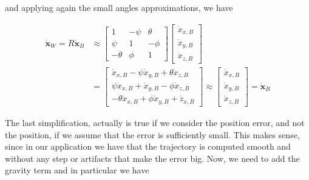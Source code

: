 \noindent and applying again the small angles approximations, we have

\begin{align}
	\dot{\mathbf{x}}_W = R\dot{\mathbf{x}}_B &\approx
	\begin{bmatrix}
		1 & -\psi & \theta \\
		\psi & 1 & -\phi \\
		-\theta & \phi & 1
	\end{bmatrix}
	\begin{bmatrix}
		\dot{x}_{x,B} \\
		\dot{x}_{y,B} \\
		\dot{x}_{z,B} 
	\end{bmatrix} \nonumber \\
	&= 
	\begin{bmatrix}
		\dot{x}_{x,B}-\psi\dot{x}_{y,B}+\theta\dot{x}_{z,B} \\
		\psi\dot{x}_{x,B}+\dot{x}_{y,B}-\phi\dot{x}_{z,B} \\
		-\theta\dot{x}_{x,B}+\phi\dot{x}_{y,B}+\dot{z}_{x,B}
	\end{bmatrix}
	\approx
	\begin{bmatrix}
		\dot{x}_{x,B} \\
		\dot{x}_{y,B} \\
		\dot{x}_{z,B}
	\end{bmatrix}
	= 
	\dot{\mathbf{x}}_B
	\label{eq:MPCdyn5}
\end{align}

\noindent The last simplification, actually is true if we consider the position error, and not the position, if we assume that the error is sufficiently small. This makes sense, since in our application we have that the trajectory is computed smooth and without any step or artifacts that make the error big. Now, we need to add the gravity term and in particular we have

